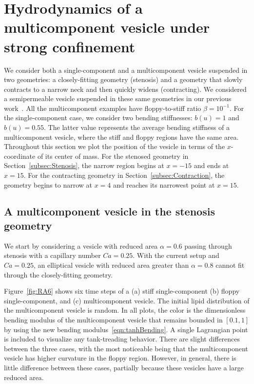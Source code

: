 \documentclass[twoside,twocolumn,9pt]{article}
\begin{document}
\section{\label{sec:results}Hydrodynamics of a multicomponent vesicle
under strong confinement}
We consider both a single-component and a multicomponent vesicle
suspended in two geometries: a closely-fitting geometry (stenosis) and a
geometry that slowly contracts to a narrow neck and then quickly widens
(contracting). We considered a semipermeable vesicle suspended in these
same geometries in our previous work~\cite{qua-gan-you2021}. All the
multicomponent examples have floppy-to-stiff ratio $\beta = 10^{-1}$.
For the single-component case, we consider two bending stiffnesses:
$b(u) = 1$ and $b(u) = 0.55$. %
The latter value represents the average bending stiffness of a multicomponent vesicle, where the stiff and floppy regions have the same area. Throughout this section we plot the position of the vesicle in terms of the $x$-coordinate of its center of mass. For the stenosed
geometry in Section~\ref{subsec:Stenosis}, the narrow region begins at
$x=-15$ and ends at $x=15$. For the contracting geometry in
Section~\ref{subsec:Contraction}, the geometry begins to narrow at $x=4$
and reaches its narrowest point at $x=15$.





\subsection{\label{subsec:Stenosis}A multicomponent vesicle in the
stenosis geometry}


We start by considering a vesicle with reduced area $\alpha = 0.6$
passing through stenosis with a capillary number $Ca = 0.25$.
With the current setup and $Ca=0.25$, an elliptical vesicle with reduced area greater than
$\alpha = 0.8$ cannot fit through the closely-fitting geometry.

Figure~\ref{fig:RA6} shows six time steps of a (a) stiff
single-component (b) floppy single-component, and (c) multicomponent
vesicle. The initial lipid distribution of the multicomponent vesicle is random.
In all plots, the color is the dimensionless bending modulus of the
multicomponent vesicle that remains bounded in $[0.1,1]$ by using the
new bending modulus~\eqref{eqn:tanhBending}. A single Lagrangian point
is included to visualize any tank-treading behavior. There are slight
differences between the three cases, with the most noticeable being that
the multicomponent vesicle has higher curvature in the floppy region.
However, in general, there is little difference between these cases,
partially because these vesicles have a large reduced area. 
\end{document}
